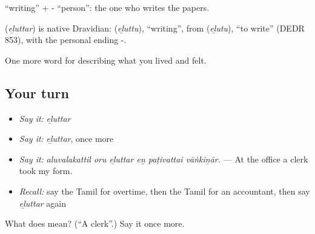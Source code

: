  \textquotedblleft{}writing\textquotedblright{} + - \textquotedblleft{}person\textquotedblright{}: the one who writes the papers.

\begin{cousinweb}
\textbf{} (\emph{eḻuttar}) is native Dravidian:  (\emph{eḻuttu}), \textquotedblleft{}writing\textquotedblright{}, from  (\emph{eḻutu}), \textquotedblleft{}to write\textquotedblright{} (DEDR 853), with the personal ending -.
\end{cousinweb}

\begin{grammarlens}[title={What you've built}]
One more word for describing what you lived and felt.
\end{grammarlens}

\subsection*{Your turn}
\begin{itemize}
\raggedright
  \item \emph{Say it:} \emph{eḻuttar}
  \item \emph{Say it:} \emph{eḻuttar}, once more
  \item \emph{Say it:} \emph{aluvalakattil oru eḻuttar eṉ paṭivattai vāṅkiṉār.} — At the office a clerk took my form.
  \item \emph{Recall:} say the Tamil for overtime, then the Tamil for an accountant, then say \emph{eḻuttar} again
\end{itemize}

\begin{tcolorbox}[breakable,colback=teal!4,colframe=teal!35!black,title={Before you move on}]
What does  mean? (\textquotedblleft{}A clerk\textquotedblright{}.) Say it once more.
\end{tcolorbox}
